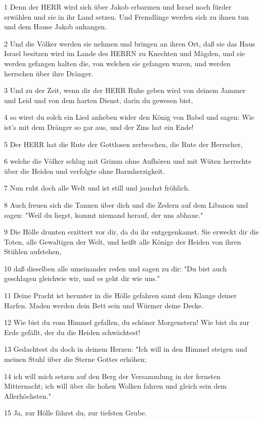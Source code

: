 \par 1 Denn der HERR wird sich über Jakob erbarmen und Israel noch fürder erwählen und sie in ihr Land setzen. Und Fremdlinge werden sich zu ihnen tun und dem Hause Jakob anhangen.
\par 2 Und die Völker werden sie nehmen und bringen an ihren Ort, daß sie das Haus Israel besitzen wird im Lande des HERRN zu Knechten und Mägden, und sie werden gefangen halten die, von welchen sie gefangen waren, und werden herrschen über ihre Dränger.
\par 3 Und zu der Zeit, wenn dir der HERR Ruhe geben wird von deinem Jammer und Leid und von dem harten Dienst, darin du gewesen bist,
\par 4 so wirst du solch ein Lied anheben wider den König von Babel und sagen: Wie ist's mit dem Dränger so gar aus, und der Zins hat ein Ende!
\par 5 Der HERR hat die Rute der Gottlosen zerbrochen, die Rute der Herrscher,
\par 6 welche die Völker schlug mit Grimm ohne Aufhören und mit Wüten herrschte über die Heiden und verfolgte ohne Barmherzigkeit.
\par 7 Nun ruht doch alle Welt und ist still und jauchzt fröhlich.
\par 8 Auch freuen sich die Tannen über dich und die Zedern auf dem Libanon und sagen: "Weil du liegst, kommt niemand herauf, der uns abhaue."
\par 9 Die Hölle drunten erzittert vor dir, da du ihr entgegenkamst. Sie erweckt dir die Toten, alle Gewaltigen der Welt, und heißt alle Könige der Heiden von ihren Stühlen aufstehen,
\par 10 daß dieselben alle umeinander reden und sagen zu dir: "Du bist auch geschlagen gleichwie wir, und es geht dir wie uns."
\par 11 Deine Pracht ist herunter in die Hölle gefahren samt dem Klange deiner Harfen. Maden werden dein Bett sein und Würmer deine Decke.
\par 12 Wie bist du vom Himmel gefallen, du schöner Morgenstern! Wie bist du zur Erde gefällt, der du die Heiden schwächtest!
\par 13 Gedachtest du doch in deinem Herzen: "Ich will in den Himmel steigen und meinen Stuhl über die Sterne Gottes erhöhen;
\par 14 ich will mich setzen auf den Berg der Versammlung in der fernsten Mitternacht; ich will über die hohen Wolken fahren und gleich sein dem Allerhöchsten."
\par 15 Ja, zur Hölle fährst du, zur tiefsten Grube.
